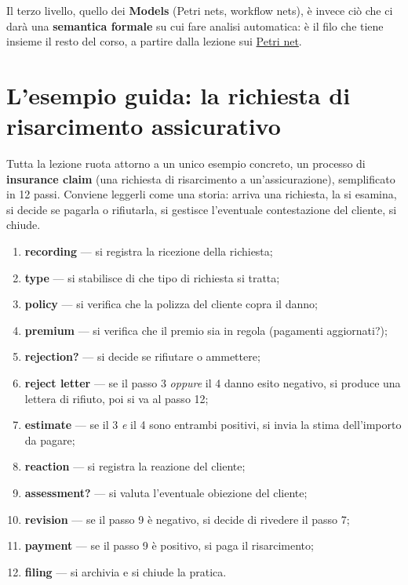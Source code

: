 Il terzo livello, quello dei \textbf{Models} (Petri nets, workflow nets), è invece ciò che ci darà una \textbf{semantica formale} su cui fare analisi automatica: è il filo che tiene insieme il resto del corso, a partire dalla lezione sui \hyperref[ch:04]{Petri net}.

\section{\texorpdfstring{L'esempio guida: la richiesta di risarcimento assicurativo}{L'esempio guida: la richiesta di risarcimento assicurativo}}

Tutta la lezione ruota attorno a un unico esempio concreto, un processo di \textbf{insurance claim} (una richiesta di risarcimento a un'assicurazione), semplificato in 12 passi. Conviene leggerli come una storia: arriva una richiesta, la si esamina, si decide se pagarla o rifiutarla, si gestisce l'eventuale contestazione del cliente, si chiude.

\begin{enumerate}
\item \textbf{recording} — si registra la ricezione della richiesta;
\item \textbf{type} — si stabilisce di che tipo di richiesta si tratta;
\item \textbf{policy} — si verifica che la polizza del cliente copra il danno;
\item \textbf{premium} — si verifica che il premio sia in regola (pagamenti aggiornati?);
\item \textbf{rejection?} — si decide se rifiutare o ammettere;
\item \textbf{reject letter} — se il passo 3 \emph{oppure} il 4 danno esito negativo, si produce una lettera di rifiuto, poi si va al passo 12;
\item \textbf{estimate} — se il 3 \emph{e} il 4 sono entrambi positivi, si invia la stima dell'importo da pagare;
\item \textbf{reaction} — si registra la reazione del cliente;
\item \textbf{assessment?} — si valuta l'eventuale obiezione del cliente;
\item \textbf{revision} — se il passo 9 è negativo, si decide di rivedere il passo 7;
\item \textbf{payment} — se il passo 9 è positivo, si paga il risarcimento;
\item \textbf{filing} — si archivia e si chiude la pratica.
\end{enumerate}

